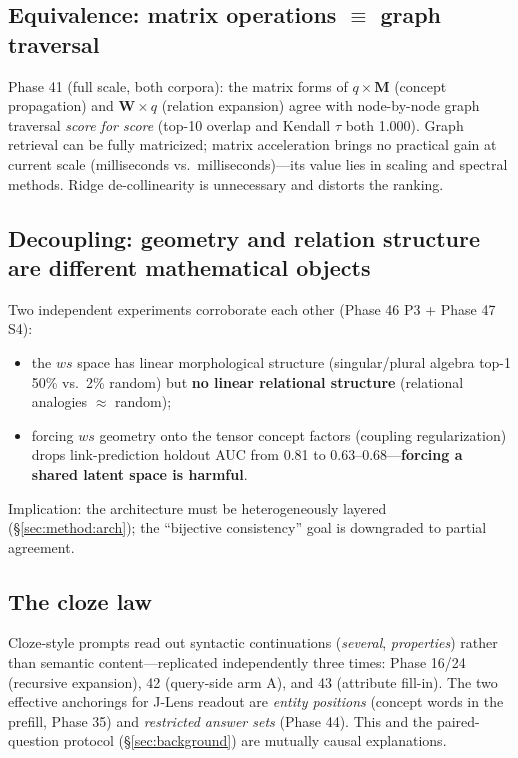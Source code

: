 \subsection{Equivalence: matrix operations $\equiv$ graph traversal}
\label{sec:math:equivalence}

Phase 41 (full scale, both corpora): the matrix forms of $q \times \mathbf{M}$
(concept propagation) and $\mathbf{W} \times q$ (relation expansion) agree with
node-by-node graph traversal \emph{score for score} (top-10 overlap and
Kendall $\tau$ both 1.000). Graph retrieval can be fully matricized; matrix
acceleration brings no practical gain at current scale (milliseconds vs.\
milliseconds)---its value lies in scaling and spectral methods. Ridge
de-collinearity is unnecessary and distorts the ranking.

\subsection{Decoupling: geometry and relation structure are different mathematical objects}
\label{sec:math:decoupling}

Two independent experiments corroborate each other (Phase 46 P3 + Phase 47 S4):
\begin{itemize}
\item the $ws$ space has linear morphological structure (singular/plural
algebra top-1 50\% vs.\ 2\% random) but \textbf{no linear relational
structure} (relational analogies $\approx$ random);
\item forcing $ws$ geometry onto the tensor concept factors (coupling
regularization) drops link-prediction holdout AUC from 0.81 to
0.63--0.68---\textbf{forcing a shared latent space is harmful}.
\end{itemize}

Implication: the architecture must be heterogeneously layered
(\S\ref{sec:method:arch}); the ``bijective consistency'' goal is downgraded to
partial agreement.

\subsection{The cloze law}
\label{sec:math:cloze}

Cloze-style prompts read out syntactic continuations (\emph{several},
\emph{properties}) rather than semantic content---replicated independently
three times: Phase 16/24 (recursive expansion), 42 (query-side arm A), and 43
(attribute fill-in). The two effective anchorings for J-Lens readout are
\emph{entity positions} (concept words in the prefill, Phase 35) and
\emph{restricted answer sets} (Phase 44). This and the paired-question protocol
(\S\ref{sec:background}) are mutually causal explanations.
